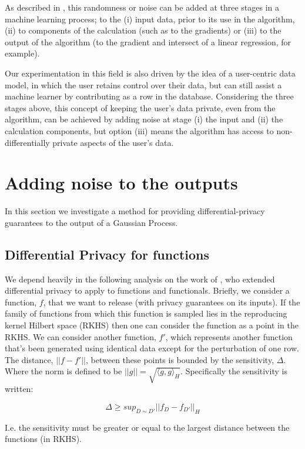 \documentclass[a4paper]{article}
\begin{document}
\begin{multicols}{2}
As described in \citet{berlioz2015applying}, this randomness or noise can be added at three stages in a machine learning process; to the (i) input data, prior to its use in the algorithm, (ii) to components of the calculation (such as to the gradients) or (iii) to the output of the algorithm (to the gradient and intersect of a linear regression, for example).

Our experimentation in this field is also driven by the idea of a user-centric data model, in which the user retains control over their data, but can still assist a machine learner by contributing as a row in the database. Considering the three stages above, this concept of keeping the user's data private, even from the algorithm, can be achieved by adding noise at stage (i) the input and (ii) the calculation components, but option (iii) means the algorithm has access to non-differentially private aspects of the user's data.

\section{Adding noise to the outputs}

In this section we investigate a method for providing differential-privacy guarantees to the output of a Gaussian Process.

\subsection{Differential Privacy for functions}

We depend heavily in the following analysis on the work of \citet{hall2013differential}, who extended differential privacy to apply to functions and functionals. Briefly, we consider a function, $f$, that we want to release (with privacy guarantees on its inputs). If the family of functions from which this function is sampled lies in the reproducing kernel Hilbert space (RKHS) then one can consider the function as a point in the RKHS. We can consider another function, $f'$, which represents another function that's been generated using identical data except for the perturbation of one row. The distance, $||f - f'||$, between these points is bounded by the sensitivity, $\Delta$. Where the norm is defined to be $|| g || = \sqrt{\langle g,g \rangle_{H}}$. Specifically the sensitivity is written:

$$\Delta \geq sup_{D \sim D'} || f_D - f_{D'} ||_H$$

I.e. the sensitivity must be greater or equal to the largest distance between the functions (in RKHS).


\end{multicols}
\end{document}
